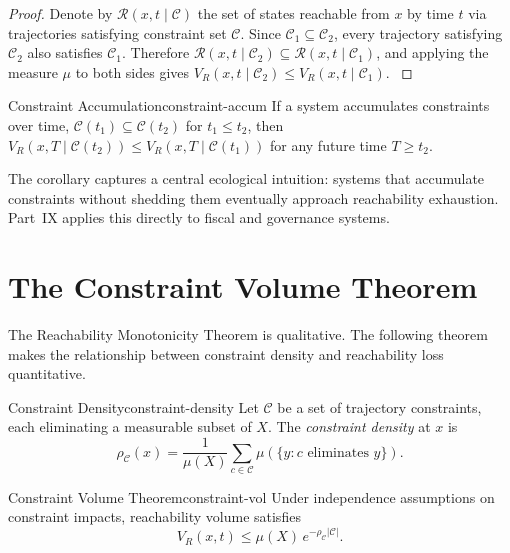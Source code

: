 \documentclass[12pt,twoside,openright]{book}
\newcommand{\reach}{\mathcal{R}}
\begin{document}
\begin{proof}
  Denote by $\reach(x,t\mid\mathcal{C})$ the set of states
  reachable from $x$ by time $t$ via trajectories satisfying
  constraint set $\mathcal{C}$. Since
  $\mathcal{C}_1\subseteq\mathcal{C}_2$, every trajectory
  satisfying $\mathcal{C}_2$ also satisfies $\mathcal{C}_1$.
  Therefore
  $\reach(x,t\mid\mathcal{C}_2) \subseteq \reach(x,t\mid\mathcal{C}_1)$,
  and applying the measure $\mu$ to both sides gives
  $V_R(x,t\mid\mathcal{C}_2) \le V_R(x,t\mid\mathcal{C}_1)$.
  \parencite{sontag1998}
\end{proof}

\begin{corollary}{Constraint Accumulation}{constraint-accum}
  If a system accumulates constraints over time,
  $\mathcal{C}(t_1)\subseteq\mathcal{C}(t_2)$ for
  $t_1\le t_2$, then
  $V_R(x,T\mid\mathcal{C}(t_2)) \le V_R(x,T\mid\mathcal{C}(t_1))$
  for any future time $T\ge t_2$.
\end{corollary}

The corollary captures a central ecological intuition:
systems that accumulate constraints without shedding them
eventually approach reachability exhaustion. Part~IX
applies this directly to fiscal and governance systems.

\section{The Constraint Volume Theorem}
\label{sec:ch13-constraint-vol}

The Reachability Monotonicity Theorem is qualitative. The
following theorem makes the relationship between constraint
density and reachability loss quantitative.

\begin{definition}{Constraint Density}{constraint-density}
  Let $\mathcal{C}$ be a set of trajectory constraints, each
  eliminating a measurable subset of $X$. The
  \emph{constraint density} at $x$ is
  \[
    \rho_\mathcal{C}(x)
    = \frac{1}{\mu(X)} \sum_{c\in\mathcal{C}}
      \mu(\{y : c\text{ eliminates }y\}).
  \]
\end{definition}

\begin{theorem}{Constraint Volume Theorem}{constraint-vol}
  Under independence assumptions on constraint impacts,
  reachability volume satisfies
  \[
    V_R(x,t) \le \mu(X)\, e^{-\rho_\mathcal{C}|\mathcal{C}|}.
  \]
\end{theorem}
\end{document}
